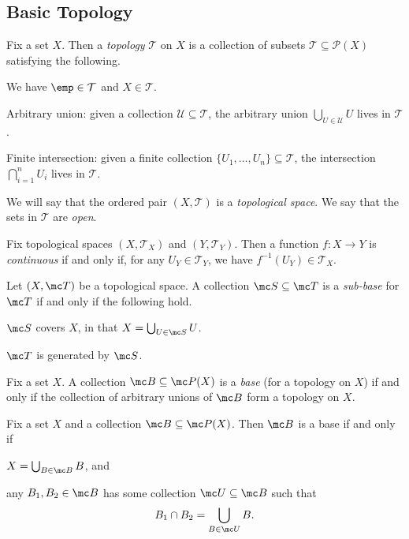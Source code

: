 \documentclass{article}
\begin{document}
\subsection{Basic Topology}
\begin{definition}[Topology]
	Fix a set $X$. Then a \textit{topology} $\mathcal T$ on $X$ is a collection of subsets $\mathcal T\subseteq\mathcal P(X)$ satisfying the following.
	\begin{listalph}
		\item We have $\emp\in\mathcal T$ and $X\in\mathcal T$.
		\item Arbitrary union: given a collection $\mathcal U\subseteq\mathcal T$, the arbitrary union $\bigcup_{U\in\mathcal U}U$ lives in $\mathcal T$.
		\item Finite intersection: given a finite collection $\{U_1,\ldots,U_n\}\subseteq\mathcal T$, the intersection $\bigcap_{i=1}^nU_i$ lives in $\mathcal T$.
	\end{listalph}
	We will say that the ordered pair $(X,\mathcal T)$ is a \textit{topological space}. We say that the sets in $\mathcal T$ are \textit{open}.
\end{definition}
\begin{definition}[Continuous]
	Fix topological spaces $(X,\mathcal T_X)$ and $(Y,\mathcal T_Y)$. Then a function $f\colon X\to Y$ is \textit{continuous} if and only if, for any $U_Y\in\mathcal T_Y$, we have $f^{-1}(U_Y)\in\mathcal T_X$.
\end{definition}
\begin{definition}
	Let $(X,\mc T)$ be a topological space. A collection $\mc S\subseteq\mc T$ is a \textit{sub-base} for $\mc T$ if and only if the following hold.
	\begin{listalph}
		\item $\mc S$ covers $X$, in that $X=\bigcup_{U\in\mc S}U$.
		\item $\mc T$ is generated by $\mc S$.
	\end{listalph}
\end{definition}
\begin{definition}[Base]
	Fix a set $X$. A collection $\mc B\subseteq\mc P(X)$ is a \textit{base} (for a topology on $X$) if and only if the collection of arbitrary unions of $\mc B$ form a topology on $X$.
\end{definition}
\begin{prop}
	Fix a set $X$ and a collection $\mc B\subseteq\mc P(X)$. Then $\mc B$ is a base if and only if
	\begin{listalph}
		\item $X=\bigcup_{B\in\mc B}B$, and
		\item any $B_1,B_2\in\mc B$ has some collection $\mc U\subseteq\mc B$ such that
		\[B_1\cap B_2=\bigcup_{B\in\mc U}B.\]
	\end{listalph}
\end{prop}
\end{document}
